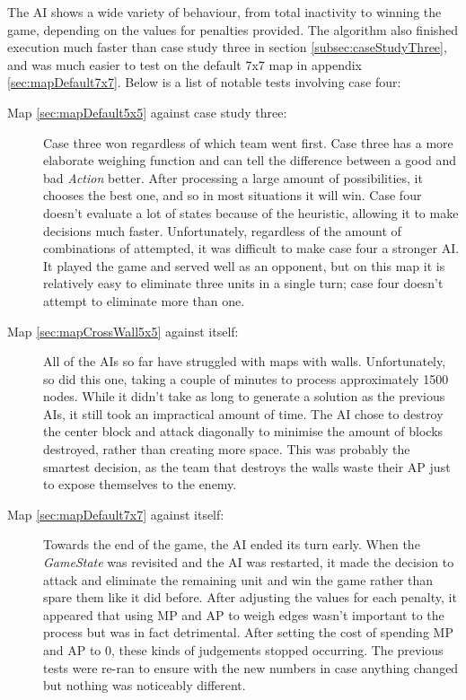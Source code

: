 \documentclass[11pt, a4paper]{report}
\begin{document}
The AI shows a wide variety of behaviour, from total inactivity to winning the game, depending on the values for penalties provided. The algorithm also finished execution much faster than case study three in section \ref{subsec:caseStudyThree}, and was much easier to test on the default 7x7 map in appendix \ref{sec:mapDefault7x7}. Below is a list of notable tests involving case four:

\begin{description}

\item[Map \ref{sec:mapDefault5x5} against case study three:] Case three won regardless of which team went first. Case three has a more elaborate weighing function and can tell the difference between a good and bad \emph{Action} better. After processing a large amount of possibilities, it chooses the best one, and so in most situations it will win. Case four doesn't evaluate a lot of states because of the heuristic, allowing it to make decisions much faster. Unfortunately, regardless of the amount of combinations of attempted, it was difficult to make case four a stronger AI. It played the game and served well as an opponent, but on this map it is relatively easy to eliminate three units in a single turn; case four doesn't attempt to eliminate more than one.

\item[Map \ref{sec:mapCrossWall5x5} against itself:] All of the AIs so far have struggled with maps with walls. Unfortunately, so did this one, taking a couple of minutes to process approximately 1500 nodes. While it didn't take as long to generate a solution as the previous AIs, it still took an impractical amount of time. The AI chose to destroy the center block and attack diagonally to minimise the amount of blocks destroyed, rather than creating more space. This was probably the smartest decision, as the team that destroys the walls waste their AP just to expose themselves to the enemy.

\item[Map \ref{sec:mapDefault7x7} against itself:] Towards the end of the game, the AI ended its turn early. When the \emph{GameState} was revisited and the AI was restarted, it made the decision to attack and eliminate the remaining unit and win the game rather than spare them like it did before. After adjusting the values for each penalty, it appeared that using MP and AP to weigh edges wasn't important to the process but was in fact detrimental. After setting the cost of spending MP and AP to 0, these kinds of judgements stopped occurring. The previous tests were re-ran to ensure with the new numbers in case anything changed but nothing was noticeably different.


\end{description}
\end{document}
